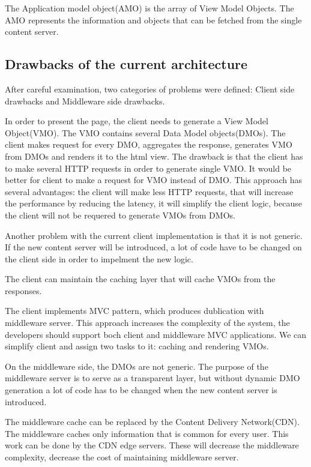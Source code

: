 The Application model object(AMO) is the array of View Model Objects. The AMO represents the information and objects that can be fetched from the single content server.

\subsection{Drawbacks of the current architecture}

After careful examination, two categories of problems were defined: Client side drawbacks and Middleware side drawbacks. 

In order to present the page, the client needs to generate a View Model Object(VMO). The VMO contains several Data Model objects(DMOs). The client makes request for every DMO, aggregates the response, generates VMO from DMOs and renders it to the html view. The drawback is that the client has to make several HTTP requests in order to generate single VMO. It would be better for client to make a request for VMO instead of DMO. This approach has several advantages: the client will make less HTTP requests, that will increase the performance by reducing the latency, it will simplify the client logic, because the client will not be requered to generate VMOs from DMOs. 

Another problem with the current client implementation is that it is not generic. If the new content server will be introduced, a lot of code have to be changed on the client side in order to impelment the new logic.

The client can maintain the caching layer that will cache VMOs from the responses. 

The client implements MVC pattern, which produces dublication with middleware server. This approach increases the complexity of the system, the developers should support boch client and middleware MVC applications. We can simplify client and assign two tasks to it: caching and rendering VMOs.

On the middleware side, the DMOs are not generic. The purpose of the middleware server is to serve as a transparent layer, but without dynamic DMO generation a lot of code has to be changed when the new content server is introduced.

The middleware cache can be replaced by the Content Delivery Network(CDN). The middleware caches only information that is common for every user. This work can be done by the CDN edge servers. These will decrease the middleware complexity, decrease the cost of maintaining middleware server.



\newpage
